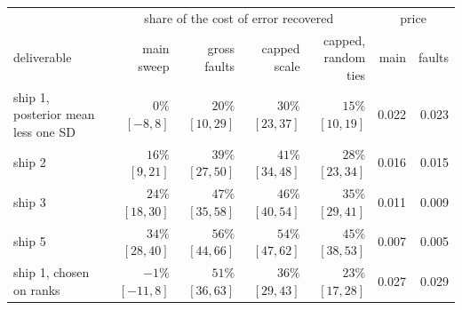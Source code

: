 \begin{tabular}{lrrrrrr}
\toprule
& \multicolumn{4}{c}{share of the cost of error recovered} & \multicolumn{2}{c}{price} \\
\cmidrule(lr){2-5} \cmidrule(lr){6-7}
deliverable & \shortstack{main\\sweep} & \shortstack{gross\\faults} & \shortstack{capped\\scale} & \shortstack{capped,\\random ties} & main & faults \\
\midrule
ship 1, posterior mean less one SD & $0\%$ {\scriptsize $[-8,8]$} & $20\%$ {\scriptsize $[10,29]$} & $30\%$ {\scriptsize $[23,37]$} & $15\%$ {\scriptsize $[10,19]$} & 0.022 & 0.023 \\
ship 2 & $16\%$ {\scriptsize $[9,21]$} & $39\%$ {\scriptsize $[27,50]$} & $41\%$ {\scriptsize $[34,48]$} & $28\%$ {\scriptsize $[23,34]$} & 0.016 & 0.015 \\
ship 3 & $24\%$ {\scriptsize $[18,30]$} & $47\%$ {\scriptsize $[35,58]$} & $46\%$ {\scriptsize $[40,54]$} & $35\%$ {\scriptsize $[29,41]$} & 0.011 & 0.009 \\
ship 5 & $34\%$ {\scriptsize $[28,40]$} & $56\%$ {\scriptsize $[44,66]$} & $54\%$ {\scriptsize $[47,62]$} & $45\%$ {\scriptsize $[38,53]$} & 0.007 & 0.005 \\
ship 1, chosen on ranks & $-1\%$ {\scriptsize $[-11,8]$} & $51\%$ {\scriptsize $[36,63]$} & $36\%$ {\scriptsize $[29,43]$} & $23\%$ {\scriptsize $[17,28]$} & 0.027 & 0.029 \\
\bottomrule
\end{tabular}
